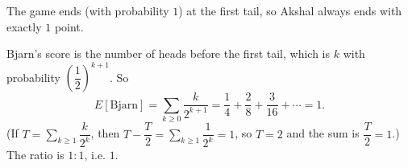 The game ends (with probability $1$) at the first tail, so Akshal always ends with exactly $1$ point.

Bjarn's score is the number of heads before the first tail, which is $k$ with probability $\left(\dfrac12\right)^{k+1}$. So
\[E[\text{Bjarn}]=\sum_{k\ge0}\dfrac{k}{2^{k+1}}=\dfrac14+\dfrac28+\dfrac3{16}+\cdots=1.\]
(If $T=\sum_{k\ge1}\dfrac{k}{2^{k}}$, then $T-\dfrac T2=\sum_{k\ge1}\dfrac1{2^k}=1$, so $T=2$ and the sum is $\dfrac T2=1$.) The ratio is $1:1$, i.e. $\boxed{1}$.
